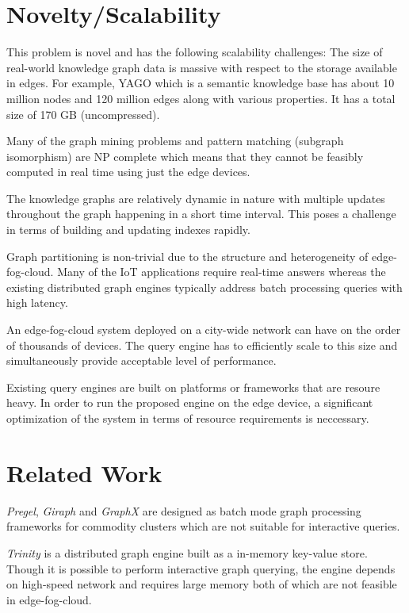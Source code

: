 \documentclass[conference]{IEEEtran}
\begin{document}
\section{Novelty/Scalability}
This problem is novel and has the following scalability challenges: The size of real-world knowledge graph data is massive with respect to the storage available in edges. For example, YAGO\cite{Suchanek:2007:YCS:1242572.1242667} which is a semantic knowledge base has about 10 million nodes and 120 million edges along with various properties. It has a total size of 170 GB (uncompressed).

Many of the graph mining problems and pattern matching (subgraph isomorphism) are NP complete which means that they cannot be feasibly computed in real time using just the edge devices. 

The knowledge graphs are relatively dynamic in nature with multiple updates throughout the graph happening in a short time interval. This poses a challenge in terms of building and updating indexes rapidly.

Graph partitioning is non-trivial due to the structure and heterogeneity of edge-fog-cloud. Many of the IoT applications require real-time answers whereas the existing distributed graph engines typically address batch processing queries with high latency.

An edge-fog-cloud system deployed on a city-wide network can have on the order of thousands of devices.  The query engine has to efficiently scale to this size and simultaneously provide acceptable level of performance.

Existing query engines are built on platforms or frameworks that are resoure heavy. In order to run the proposed engine on the edge device, a significant optimization of the system in terms of resource requirements is neccessary. 

\section{Related Work}

\emph{Pregel}\cite{Malewicz:2010:PSL:1807167.1807184}, \emph{Giraph}\cite{Ching:2015:OTE:2824032.2824077} and \emph{GraphX}\cite{Xin:2013:GRD:2484425.2484427} are designed as batch mode graph processing frameworks for commodity clusters which are not suitable for interactive queries.

\emph{Trinity}\cite{Shao:2013:TDG:2463676.2467799} is a distributed graph engine built as a in-memory key-value store. Though it is possible to perform interactive graph querying, the engine depends on high-speed network and requires large memory both of which are not feasible in edge-fog-cloud.
\end{document}
